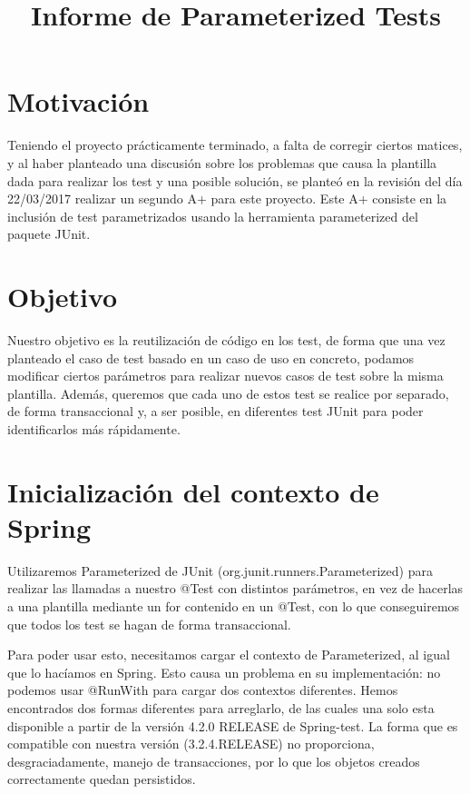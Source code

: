 \documentclass[a4paper]{article}
\title{Informe de Parameterized Tests}
\date{}
\begin{document}
\setlength{\voffset}{-1in}
\setlength{\textheight}{680px}
\setlength{\headsep}{30px}
\maketitle

\section{Motivación}

Teniendo el proyecto prácticamente terminado, a falta de corregir ciertos matices, y al haber planteado una discusión sobre los problemas que causa la plantilla dada para realizar los test y una posible solución, se planteó en la revisión del día 22/03/2017 realizar un segundo A+ para este proyecto. Este A+ consiste en la inclusión de test parametrizados usando la herramienta parameterized del paquete JUnit.

\section{Objetivo}

Nuestro objetivo es la reutilización de código en los test, de forma que una vez planteado el caso de test basado en un caso de uso en concreto, podamos modificar ciertos parámetros para realizar nuevos casos de test sobre la misma plantilla. Además, queremos que cada uno de estos test se realice por separado, de forma transaccional y, a ser posible, en diferentes test JUnit para poder identificarlos más rápidamente.

\section{Inicialización del contexto de Spring}

Utilizaremos Parameterized de JUnit (org.junit.runners.Parameterized) para realizar las llamadas a nuestro @Test con distintos parámetros, en vez de hacerlas a una plantilla mediante un for contenido en un @Test, con lo que conseguiremos que todos los test se hagan de forma transaccional. 

Para poder usar esto, necesitamos cargar el contexto de Parameterized, al igual que lo hacíamos en Spring. Esto causa un problema en su implementación: no podemos usar @RunWith para cargar dos contextos diferentes. Hemos encontrados dos formas diferentes para arreglarlo, de las cuales una solo esta disponible a partir de la versión 4.2.0 RELEASE de Spring-test. La forma que es compatible con nuestra versión (3.2.4.RELEASE) no proporciona, desgraciadamente, manejo de transacciones, por lo que los objetos creados correctamente quedan persistidos. 
\end{document}
